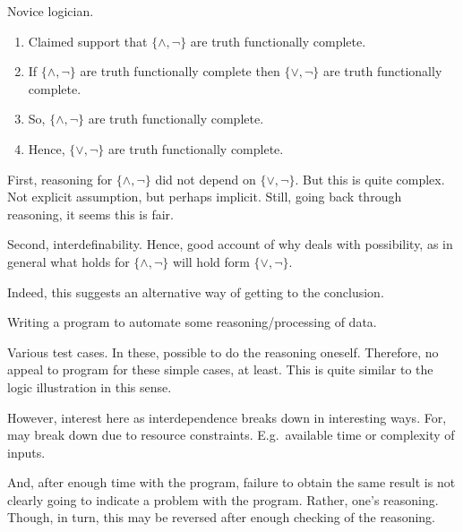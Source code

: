 \begin{note}[Logician]
  \begin{illustration}\label{illu:CS:tfc}
    Novice logician.
    \begin{enumerate}
    \item Claimed support that \(\{\land,\lnot\}\) are truth functionally complete.
    \item If \(\{\land,\lnot\}\) are truth functionally complete then \(\{\lor,\lnot\}\) are truth functionally complete.
    \item So, \(\{\land,\lnot\}\) are truth functionally complete.
    \item Hence, \(\{\lor,\lnot\}\) are truth functionally complete.
    \end{enumerate}
  \end{illustration}

  First, reasoning for \(\{\land,\lnot\}\) did not depend on \(\{\lor,\lnot\}\).
  But this is quite complex.
  Not explicit assumption, but perhaps implicit.
  Still, going back through reasoning, it seems this is fair.

  Second, interdefinability.
  Hence, good account of why deals with possibility, as in general what holds for \(\{\land,\lnot\}\) will hold form \(\{\lor,\lnot\}\).

  Indeed, this suggests an alternative way of getting to the conclusion.
\end{note}

\begin{note}[Programming]
  \begin{illustration}
    \label{illu:programming}
    Writing a program to automate some reasoning/processing of data.
  \end{illustration}
  Various test cases.
  In these, possible to do the reasoning oneself.
  Therefore, no appeal to program for these simple cases, at least.
  This is quite similar to the logic illustration in this sense.

  However, interest here as interdependence breaks down in interesting ways.
  For, may break down due to resource constraints.
  E.g.\ available time or complexity of inputs.

  And, after enough time with the program, failure to obtain the same result is not clearly going to indicate a problem with the program.
  Rather, one's reasoning.
  Though, in turn, this may be reversed after enough checking of the reasoning.
\end{note}

